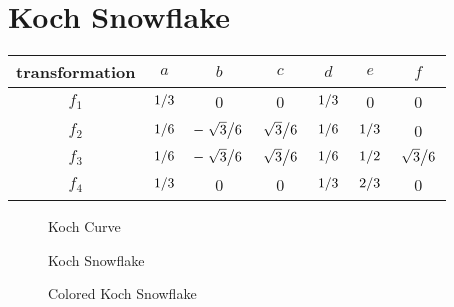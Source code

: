 \documentclass[12pt,a4paper]{article}
\newcommand{\figpath}{../fig}
\begin{document}
    \section{Koch Snowflake}
    \begin{table}
        \centering
        \begin{tabular}{|c|c|c|c|c|c|c|}
            \hline
            transformation & $a$ & $b$ & $c$ & $d$ & $e$ & $f$ \\
            \hline
            $f_1$ & $\flatfrac{1}{3}$ & 0 & 0 & $\flatfrac{1}{3}$ & 0 & 0 \\
            \hline
            $f_2$ & $\flatfrac{1}{6}$ & $-\flatfrac{\sqrt{3}}{6}$ & $\flatfrac{\sqrt{3}}{6}$ & $\flatfrac{1}{6}$ & $\flatfrac{1}{3}$ & 0 \\
            \hline
            $f_3$ & $\flatfrac{1}{6}$ & $-\flatfrac{\sqrt{3}}{6}$ & $\flatfrac{\sqrt{3}}{6}$ & $\flatfrac{1}{6}$ & $\flatfrac{1}{2}$ & $\flatfrac{\sqrt{3}}{6}$ \\
            \hline
            $f_4$ & $\flatfrac{1}{3}$ & 0 & 0 & $\flatfrac{1}{3}$ & $\flatfrac{2}{3}$ & 0 \\
            \hline
        \end{tabular}
    \end{table}
    \begin{figure}
        \centering
        \caption{Koch Curve}
    \end{figure}
    \begin{figure}
        \centering
        \caption{Koch Snowflake}
    \end{figure}
    \begin{figure}
        \centering
        \caption{Colored Koch Snowflake}
    \end{figure}
\end{document}
